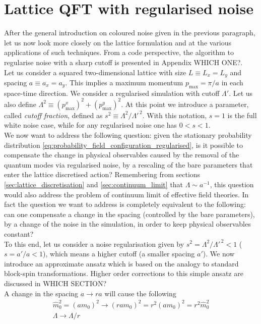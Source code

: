 \section{Lattice QFT with regularised noise}
After the general introduction on coloured noise given in the previous paragraph, let us now look more closely on the lattice formulation and at the various applications of such techniques.
From a code perspective, the algorithm to regularise noise with a sharp cutoff is presented in Appendix WHICH ONE?. \\
Let us consider a squared two-dimensional lattice with size $L \equiv L_x = L_y$ and spacing $a \equiv a_x = a_y$. This implies a maximum momentum $p_\text{max} = \pi / a$ in each space-time direction. We consider a regularised simulation with cutoff $\Lambda'$. Let us also define $\Lambda^2 \equiv (p^x_\text{max})^2 + (p^y_\text{max})^2$. At this point we introduce a parameter, called \emph{cutoff fraction}, defined as $s^2 \equiv \Lambda^2 / \Lambda'^{\,2}$. With this notation, $s=1$ is the full white noise case, while for any regularised noise one has $0 < s < 1$. \\
We now want to address the following question: given the stationary probability distribution \ref{eq:probability_field_configuration_regularised}, is it possible to compensate the change in physical observables caused by the removal of the quantum modes via regularised noise, by a rescaling of the bare parameters that enter the lattice discretised action? Remembering from sections \ref{sec:lattice_discretisation} and \ref{sec:continuum_limit} that $\Lambda \sim a^{-1}$, this question would also address the problem of continuum limit of effective field theories. In fact the question we want to address is completely equivalent to the following: can one compensate a change in the spacing (controlled by the bare parameters), by a change of the noise in the simulation, in order to keep physical observables constant?\\
To this end, let us consider a noise regularisation given by $s^2 = \Lambda^2 / \Lambda'^{\,2} < 1$ ($s = a' / a < 1$), which means a higher cutoff (a smaller spacing $a'$). We now introduce an approximate ansatz which is based on the analogy to standard block-spin transformations. Higher order corrections to this simple ansatz are discussed in WHICH SECTION? \\
A change in the spacing $a \to ra$ will cause the following
\begin{gather*}
    \hat m_0^2 = (a m_0)^2 \to (ra m_0)^2 = r^2 (a m_0)^2 = r^2 \hat m_0^2 \\
    \Lambda \to \Lambda / r
\end{gather*}


